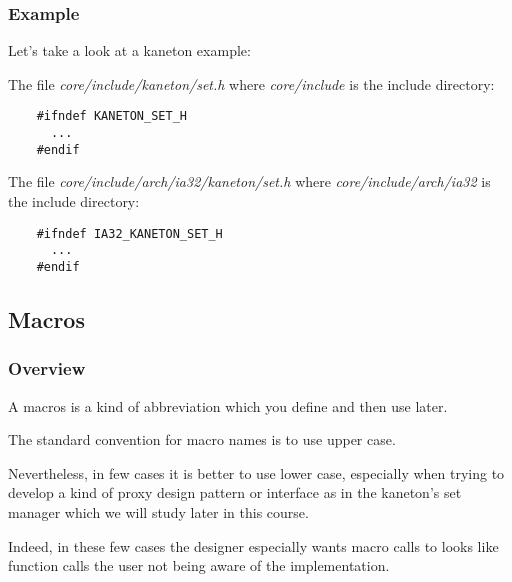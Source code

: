 \documentclass[8pt]{beamer}
\newcommand{\nl}[0]{\vspace{0.4cm}}
\begin{document}
\begin{frame}[containsverbatim]
  \frametitle{Example}

  Let's take a look at a kaneton example:

  \nl

  The file \textit{core/include/kaneton/set.h} where \textit{core/include}
  is the include directory:

  \begin{verbatim}
    #ifndef KANETON_SET_H
      ...
    #endif
  \end{verbatim}

  The file \textit{core/include/arch/ia32/kaneton/set.h} where
  \textit{core/include/arch/ia32} is the include directory:

  \begin{verbatim}
    #ifndef IA32_KANETON_SET_H
      ...
    #endif
  \end{verbatim}
\end{frame}

%
%

\subsection{Macros}


\begin{frame}
  \frametitle{Overview}

  A macros is a kind of abbreviation which you define and then use later.

  \nl

  The standard convention for macro names is to use upper case.

  \nl

  Nevertheless, in few cases it is better to use lower case, especially
  when trying to develop a kind of proxy design pattern or interface as
  in the kaneton's set manager which we will study later in this course.

  \nl

  Indeed, in these few cases the designer especially wants macro calls
  to looks like function calls the user not being aware of the implementation.
\end{frame}

\end{document}
